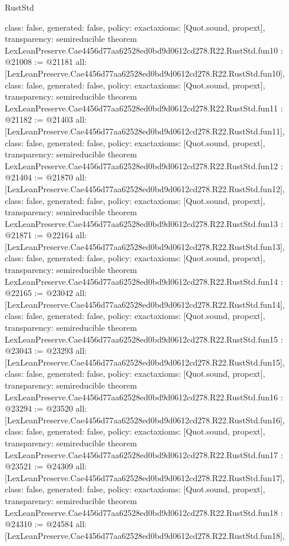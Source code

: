 \begin{lexlean}{RustStd}
\begin{coremodule}
{  class: false,
  generated: false,
  policy: exact{axioms: [Quot.sound, propext]},
  transparency: semireducible
}
theorem LexLeanPreserve.Cae4456d77aa62528ed0bd9d0612cd278.R22.RustStd.fun10 : @21008 := @21181 {
  all: [LexLeanPreserve.Cae4456d77aa62528ed0bd9d0612cd278.R22.RustStd.fun10],
  class: false,
  generated: false,
  policy: exact{axioms: [Quot.sound, propext]},
  transparency: semireducible
}
theorem LexLeanPreserve.Cae4456d77aa62528ed0bd9d0612cd278.R22.RustStd.fun11 : @21182 := @21403 {
  all: [LexLeanPreserve.Cae4456d77aa62528ed0bd9d0612cd278.R22.RustStd.fun11],
  class: false,
  generated: false,
  policy: exact{axioms: [Quot.sound, propext]},
  transparency: semireducible
}
theorem LexLeanPreserve.Cae4456d77aa62528ed0bd9d0612cd278.R22.RustStd.fun12 : @21404 := @21870 {
  all: [LexLeanPreserve.Cae4456d77aa62528ed0bd9d0612cd278.R22.RustStd.fun12],
  class: false,
  generated: false,
  policy: exact{axioms: [Quot.sound, propext]},
  transparency: semireducible
}
theorem LexLeanPreserve.Cae4456d77aa62528ed0bd9d0612cd278.R22.RustStd.fun13 : @21871 := @22164 {
  all: [LexLeanPreserve.Cae4456d77aa62528ed0bd9d0612cd278.R22.RustStd.fun13],
  class: false,
  generated: false,
  policy: exact{axioms: [Quot.sound, propext]},
  transparency: semireducible
}
theorem LexLeanPreserve.Cae4456d77aa62528ed0bd9d0612cd278.R22.RustStd.fun14 : @22165 := @23042 {
  all: [LexLeanPreserve.Cae4456d77aa62528ed0bd9d0612cd278.R22.RustStd.fun14],
  class: false,
  generated: false,
  policy: exact{axioms: [Quot.sound, propext]},
  transparency: semireducible
}
theorem LexLeanPreserve.Cae4456d77aa62528ed0bd9d0612cd278.R22.RustStd.fun15 : @23043 := @23293 {
  all: [LexLeanPreserve.Cae4456d77aa62528ed0bd9d0612cd278.R22.RustStd.fun15],
  class: false,
  generated: false,
  policy: exact{axioms: [Quot.sound, propext]},
  transparency: semireducible
}
theorem LexLeanPreserve.Cae4456d77aa62528ed0bd9d0612cd278.R22.RustStd.fun16 : @23294 := @23520 {
  all: [LexLeanPreserve.Cae4456d77aa62528ed0bd9d0612cd278.R22.RustStd.fun16],
  class: false,
  generated: false,
  policy: exact{axioms: [Quot.sound, propext]},
  transparency: semireducible
}
theorem LexLeanPreserve.Cae4456d77aa62528ed0bd9d0612cd278.R22.RustStd.fun17 : @23521 := @24309 {
  all: [LexLeanPreserve.Cae4456d77aa62528ed0bd9d0612cd278.R22.RustStd.fun17],
  class: false,
  generated: false,
  policy: exact{axioms: [Quot.sound, propext]},
  transparency: semireducible
}
theorem LexLeanPreserve.Cae4456d77aa62528ed0bd9d0612cd278.R22.RustStd.fun18 : @24310 := @24584 {
  all: [LexLeanPreserve.Cae4456d77aa62528ed0bd9d0612cd278.R22.RustStd.fun18],
}
\end{coremodule}
\end{lexlean}
